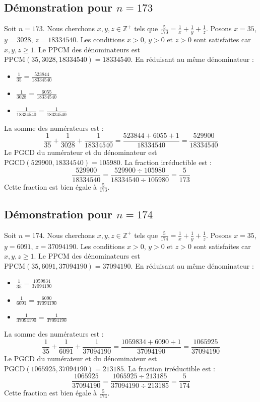 \documentclass[11pt,a4paper]{article}
\begin{document}
\subsection{Démonstration pour $n = 173$}
Soit $n = 173$. Nous cherchons $x, y, z \in \mathbb{Z}^{+}$ tels que $\frac{5}{173} = \frac{1}{x} + \frac{1}{y} + \frac{1}{z}$.
Posons $x = 35$, $y = 3028$, $z = 18334540$.
Les conditions $x > 0$, $y > 0$ et $z > 0$ sont satisfaites car $x, y, z \geq 1$.
Le PPCM des dénominateurs est $\text{PPCM}(35, 3028, 18334540) = 18334540$.
En réduisant au même dénominateur :
\begin{itemize}
    \item $\frac{1}{35} = \frac{523844}{18334540}$
    \item $\frac{1}{3028} = \frac{6055}{18334540}$
    \item $\frac{1}{18334540} = \frac{1}{18334540}$
\end{itemize}
La somme des numérateurs est :
$$ \frac{1}{35} + \frac{1}{3028} + \frac{1}{18334540} = \frac{523844 + 6055 + 1}{18334540} = \frac{529900}{18334540} $$
Le PGCD du numérateur et du dénominateur est $\text{PGCD}(529900, 18334540) = 105980$.
La fraction irréductible est :
$$ \frac{529900}{18334540} = \frac{529900 \div 105980}{18334540 \div 105980} = \frac{5}{173} $$
Cette fraction est bien égale à $\frac{5}{173}$.

\subsection{Démonstration pour $n = 174$}
Soit $n = 174$. Nous cherchons $x, y, z \in \mathbb{Z}^{+}$ tels que $\frac{5}{174} = \frac{1}{x} + \frac{1}{y} + \frac{1}{z}$.
Posons $x = 35$, $y = 6091$, $z = 37094190$.
Les conditions $x > 0$, $y > 0$ et $z > 0$ sont satisfaites car $x, y, z \geq 1$.
Le PPCM des dénominateurs est $\text{PPCM}(35, 6091, 37094190) = 37094190$.
En réduisant au même dénominateur :
\begin{itemize}
    \item $\frac{1}{35} = \frac{1059834}{37094190}$
    \item $\frac{1}{6091} = \frac{6090}{37094190}$
    \item $\frac{1}{37094190} = \frac{1}{37094190}$
\end{itemize}
La somme des numérateurs est :
$$ \frac{1}{35} + \frac{1}{6091} + \frac{1}{37094190} = \frac{1059834 + 6090 + 1}{37094190} = \frac{1065925}{37094190} $$
Le PGCD du numérateur et du dénominateur est $\text{PGCD}(1065925, 37094190) = 213185$.
La fraction irréductible est :
$$ \frac{1065925}{37094190} = \frac{1065925 \div 213185}{37094190 \div 213185} = \frac{5}{174} $$
Cette fraction est bien égale à $\frac{5}{174}$.
\end{document}
